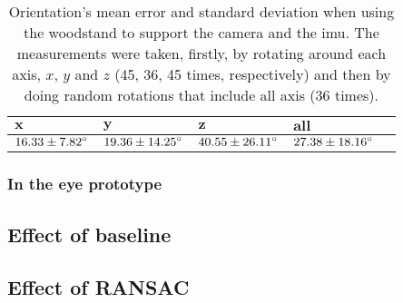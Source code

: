 \begin{table}[]
	\centering
	\renewcommand{\arraystretch}{1.5}%
	\begin{tabular}{| l | l | l | l | l |}
		\hline
		 $\mathbf{x}$ &$\mathbf{y}$  & $\mathbf{z}$  & $\mathbf{all}$ \\
		 \hline
		 $16.33 \pm{7.82} \degree $ & 
		 $19.36 \pm{14.25} \degree$ &  
		 $40.55 \pm{26.11} \degree$ & 
		 $27.38 \pm{18.16} \degree $ \\
		\hline
	\end{tabular}
	\caption[IMU orientation's mean error and standard deviation when using the woodstand]{Orientation's mean error and standard deviation when using the woodstand to support the camera and the \acrshort{imu}. The measurements were taken, firstly, by rotating around each axis, $x$, $y$ and $z$ (45, 36, 45 times, respectively) and then by doing random rotations that include all axis (36 times).}
	\label{cha4:sec2:woodstandres}
\end{table}

\subsubsection{In the eye prototype}
\subsection{Effect of baseline}
\subsection{Effect of RANSAC}
